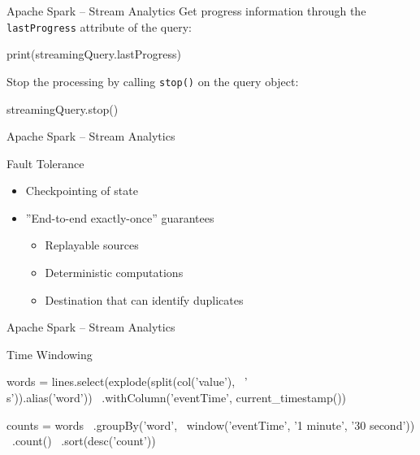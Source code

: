 \documentclass[ignorenonframetext,xcolor=x11names]{beamer}
\begin{document}
\begin{frame}[fragile]{Apache Spark -- Stream Analytics}
Get progress information through the \texttt{lastProgress} attribute of the query:
\begin{pythoncode}
print(streamingQuery.lastProgress)
\end{pythoncode}
Stop the processing by calling \texttt{stop()} on the query object:
\begin{pythoncode}
streamingQuery.stop()
\end{pythoncode}
\end{frame}

\begin{frame}[fragile]{Apache Spark -- Stream Analytics}
\begin{block}{Fault Tolerance}
\begin{itemize}
   \item Checkpointing of state
   \item ''End-to-end exactly-once'' guarantees
   \begin{itemize}
       \item Replayable sources
       \item Deterministic computations   
       \item Destination that can identify duplicates
   \end{itemize}
\end{itemize}
\end{block}
\end{frame}

\begin{frame}[fragile]{Apache Spark -- Stream Analytics}
\begin{block}{Time Windowing}
\begin{pythoncode}
words = lines.select(explode(split(col('value'), \
    '\\s')).alias('word')) \
    .withColumn('eventTime', current_timestamp())

counts = words \
    .groupBy('word', \
        window('eventTime', '1 minute', '30 second')) \
    .count() \
    .sort(desc('count'))
\end{pythoncode}
\end{block}
\end{frame}
\end{document}
